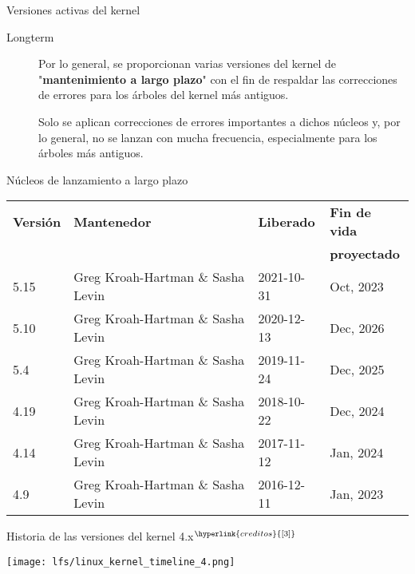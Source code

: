 \begin{frame}[c]{Versiones activas del kernel}
  \begin{description}
    \item[Longterm] Por lo general, se proporcionan varias versiones del
      kernel de "\textbf{mantenimiento a largo plazo}" con el fin de
      respaldar las correcciones de errores para los árboles del kernel
      más antiguos.

      \vspace{\baselineskip}
      Solo se aplican correcciones de errores importantes a dichos núcleos
      y, por lo general, no se lanzan con mucha frecuencia,
      especialmente para los árboles más antiguos. 
  \end{description}
\end{frame}

\begin{frame}[c]{Núcleos de lanzamiento a largo plazo}
  \begin{table}[]
  \begin{tabular}{llll}
    \textbf{Versión} &  \textbf{Mantenedor} & \textbf{Liberado} & \textbf{Fin de vida} \\
     & & & \textbf{proyectado} \\
    \rowcolor{editorGray}
    5.15&Greg Kroah-Hartman \& Sasha Levin 	&2021-10-31 	&Oct, 2023 \\
    5.10&Greg Kroah-Hartman \& Sasha Levin 	&2020-12-13 	&Dec, 2026 \\
    \rowcolor{editorGray}
    5.4&Greg Kroah-Hartman \& Sasha Levin 	&2019-11-24 	&Dec, 2025 \\
    4.19&Greg Kroah-Hartman \& Sasha Levin 	&2018-10-22 	&Dec, 2024 \\
    \rowcolor{editorGray}
    4.14&Greg Kroah-Hartman \& Sasha Levin 	&2017-11-12 	&Jan, 2024 \\
    4.9&Greg Kroah-Hartman \& Sasha Levin 	&2016-12-11 	&Jan, 2023 \\
  \end{tabular}
  \end{table}
\end{frame}



\begin{frame}[c]{Historia de las versiones del kernel 4.x$^{\hyperlink{creditos}{[3]}}$}
  \begin{center}
    \texttt{[image: lfs/linux\_kernel\_timeline\_4.png]}
  \end{center}
\end{frame}

